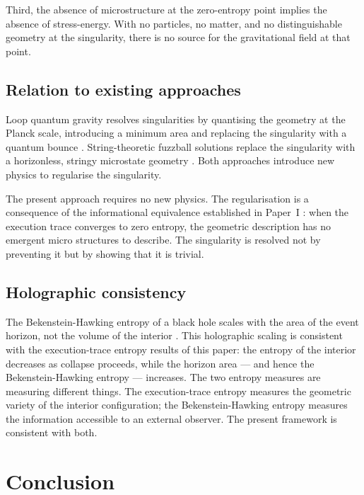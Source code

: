\documentclass[11pt]{article}
\begin{document}
Third, the absence of microstructure at the zero-entropy point implies
the absence of stress-energy. With no particles, no matter, and no
distinguishable geometry at the singularity, there is no source for the
gravitational field at that point. 


\subsection{Relation to existing approaches}

Loop quantum gravity resolves singularities by quantising the geometry at
the Planck scale, introducing a minimum area and replacing the singularity
with a quantum bounce \cite{ashtekar2006}. String-theoretic fuzzball
solutions replace the singularity with a horizonless, stringy microstate
geometry \cite{mathur2005}. Both approaches introduce new physics to
regularise the singularity.

The present approach requires no new physics. The regularisation is a
consequence of the informational equivalence established in Paper~I \cite{meskanen2001}: when
the execution trace converges to zero entropy, the geometric description
has no emergent micro structures to describe. The singularity is resolved not by
preventing it but by showing that it is trivial.

\subsection{Holographic consistency}

The Bekenstein-Hawking entropy of a black hole scales with the area of the
event horizon, not the volume of the interior \cite{bekenstein1973,
hawking1975}. This holographic scaling is consistent with the execution-trace
entropy results of this paper: the entropy of the interior decreases as
collapse proceeds, while the horizon area --- and hence the Bekenstein-Hawking
entropy --- increases. The two entropy measures are measuring different things.
The execution-trace entropy measures the geometric variety of the interior
configuration; the Bekenstein-Hawking entropy measures the information
accessible to an external observer. The present framework is consistent with
both.


\section{Conclusion}
\label{sec:conclusion}
\end{document}
